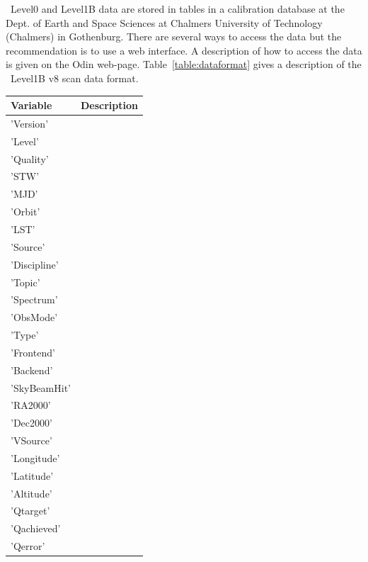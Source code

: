 \smr\ Level0 and Level1B data are stored in tables
in a calibration database at the Dept. of Earth and Space
Sciences at Chalmers University of Technology (Chalmers) in Gothenburg.
There are several ways to access the data but the recommendation is to use a web 
interface. A description of how to access the data
is given on the Odin web-page. Table~\ref{table:dataformat} gives a description 
of the \smr\ Level1B v8 scan data format.

\begin{longtable}{| p{} | p{} |} 
\hline
  \textbf{Variable} & \textbf{Description} \\
  \hline
     'Version'         & \\ \hline
     'Level'           & \\ \hline
     'Quality'         & \\ \hline
     'STW'             & \\ \hline
     'MJD'             & \\ \hline
     'Orbit'           & \\ \hline
     'LST'             & \\ \hline
     'Source'          & \\ \hline
     'Discipline'      & \\ \hline
     'Topic'           & \\ \hline
     'Spectrum'        & \\    \hline
     'ObsMode'         & \\ \hline
     'Type'            & \\ \hline
     'Frontend'        & \\ \hline
     'Backend'         & \\ \hline
     'SkyBeamHit'      & \\ \hline
     'RA2000'          & \\ \hline
     'Dec2000'         & \\ \hline
     'VSource'         & \\ \hline
     'Longitude'       & \\ \hline
     'Latitude'        & \\ \hline
     'Altitude'        & \\ \hline
     'Qtarget'         & \\ \hline
     'Qachieved'       & \\ \hline
     'Qerror'          & \\ \hline

\end{longtable}
